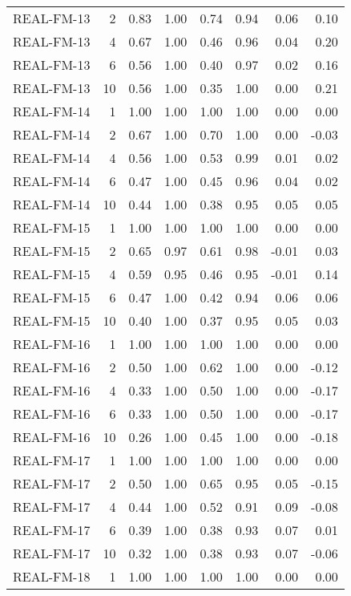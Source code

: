\begin{table}[ht]
\begin{tabular}{lrrrrrrr}
  REAL-FM-13 &   2 & 0.83 & 1.00 & 0.74 & 0.94 & 0.06 & 0.10 \\ 
  REAL-FM-13 &   4 & 0.67 & 1.00 & 0.46 & 0.96 & 0.04 & 0.20 \\ 
  REAL-FM-13 &   6 & 0.56 & 1.00 & 0.40 & 0.97 & 0.02 & 0.16 \\ 
  REAL-FM-13 &  10 & 0.56 & 1.00 & 0.35 & 1.00 & 0.00 & 0.21 \\ 
  REAL-FM-14 &   1 & 1.00 & 1.00 & 1.00 & 1.00 & 0.00 & 0.00 \\ 
  REAL-FM-14 &   2 & 0.67 & 1.00 & 0.70 & 1.00 & 0.00 & -0.03 \\ 
  REAL-FM-14 &   4 & 0.56 & 1.00 & 0.53 & 0.99 & 0.01 & 0.02 \\ 
  REAL-FM-14 &   6 & 0.47 & 1.00 & 0.45 & 0.96 & 0.04 & 0.02 \\ 
  REAL-FM-14 &  10 & 0.44 & 1.00 & 0.38 & 0.95 & 0.05 & 0.05 \\ 
  REAL-FM-15 &   1 & 1.00 & 1.00 & 1.00 & 1.00 & 0.00 & 0.00 \\ 
  REAL-FM-15 &   2 & 0.65 & 0.97 & 0.61 & 0.98 & -0.01 & 0.03 \\ 
  REAL-FM-15 &   4 & 0.59 & 0.95 & 0.46 & 0.95 & -0.01 & 0.14 \\ 
  REAL-FM-15 &   6 & 0.47 & 1.00 & 0.42 & 0.94 & 0.06 & 0.06 \\ 
  REAL-FM-15 &  10 & 0.40 & 1.00 & 0.37 & 0.95 & 0.05 & 0.03 \\ 
  REAL-FM-16 &   1 & 1.00 & 1.00 & 1.00 & 1.00 & 0.00 & 0.00 \\ 
  REAL-FM-16 &   2 & 0.50 & 1.00 & 0.62 & 1.00 & 0.00 & -0.12 \\ 
  REAL-FM-16 &   4 & 0.33 & 1.00 & 0.50 & 1.00 & 0.00 & -0.17 \\ 
  REAL-FM-16 &   6 & 0.33 & 1.00 & 0.50 & 1.00 & 0.00 & -0.17 \\ 
  REAL-FM-16 &  10 & 0.26 & 1.00 & 0.45 & 1.00 & 0.00 & -0.18 \\ 
  REAL-FM-17 &   1 & 1.00 & 1.00 & 1.00 & 1.00 & 0.00 & 0.00 \\ 
  REAL-FM-17 &   2 & 0.50 & 1.00 & 0.65 & 0.95 & 0.05 & -0.15 \\ 
  REAL-FM-17 &   4 & 0.44 & 1.00 & 0.52 & 0.91 & 0.09 & -0.08 \\ 
  REAL-FM-17 &   6 & 0.39 & 1.00 & 0.38 & 0.93 & 0.07 & 0.01 \\ 
  REAL-FM-17 &  10 & 0.32 & 1.00 & 0.38 & 0.93 & 0.07 & -0.06 \\ 
  REAL-FM-18 &   1 & 1.00 & 1.00 & 1.00 & 1.00 & 0.00 & 0.00 \\ 

\end{tabular}
\end{table}
